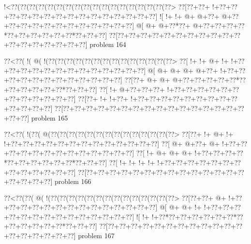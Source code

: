 \vbox{\vbox{\goo
\- !<\0??(\0??(\0??(\0??(\0??(\0??(\0??(\0??(\0??(\0??(\0??(\0??(\0??(\0??(\0??(\0??(\0??(\0??>
\0??[\0??+\0??+\- !+\0??+\0??+\0??+\0??+\0??+\0??+\0??+\0??+\0??+\0??+\0??+\0??+\0??+\0??+\0??]
\- ![\- !+\- !+\- @+\- @+\0??+\- @+\0??+\0??+\0??+\0??+\0??+\0??+\0??+\0??+\0??+\0??+\0??+\0??]
\- @[\- @+\- @+\0??*\0??+\- @+\0??+\0??+\0??+\0??*\0??+\0??+\0??+\0??+\0??+\0??*\0??+\0??+\0??]
\0??[\0??+\0??+\0??+\0??+\0??+\0??+\0??+\0??+\0??+\0??+\0??+\0??+\0??+\0??+\0??+\0??+\0??+\0??]
}
\hfil problem 164\hfil\break
}



\vbox{\vbox{\goo
\0??<\0??(\- !(\- @(\- !(\0??(\0??(\0??(\0??(\0??(\0??(\0??(\0??(\0??(\0??(\0??(\0??(\0??(\0??>
\0??[\- !+\- !+\- @+\- !+\- !+\0??+\0??+\0??+\0??+\0??+\0??+\0??+\0??+\0??+\0??+\0??+\0??+\0??]
\- @[\- @+\- @+\- @+\- @+\0??+\- !+\0??+\0??+\0??+\0??+\0??+\0??+\0??+\0??+\0??+\0??+\0??+\0??]
\0??[\0??+\- @+\- @+\- @+\0??+\0??+\0??+\0??+\0??*\0??+\0??+\0??+\0??+\0??+\0??*\0??+\0??+\0??]
\0??[\- !+\- @+\0??+\0??+\0??+\- !+\0??+\0??+\0??+\0??+\0??+\0??+\0??+\0??+\0??+\0??+\0??+\0??]
\0??[\0??+\- !+\- !+\0??+\- !+\0??+\0??+\0??+\0??+\0??+\0??+\0??+\0??+\0??+\0??+\0??+\0??+\0??]
\0??[\0??+\0??+\0??+\0??+\0??+\0??+\0??+\0??+\0??+\0??+\0??+\0??+\0??+\0??+\0??+\0??+\0??+\0??]
}
\hfil problem 165\hfil\break
}



\vbox{\vbox{\goo
\0??<\0??(\- !(\0??(\- @(\0??(\0??(\0??(\0??(\0??(\0??(\0??(\0??(\0??(\0??(\0??(\0??(\0??(\0??>
\0??[\0??+\- !+\- @+\- !+\- !+\0??+\0??+\0??+\0??+\0??+\0??+\0??+\0??+\0??+\0??+\0??+\0??+\0??]
\0??[\- @+\- @+\0??+\- @+\- !+\0??+\0??+\0??+\0??+\0??+\0??+\0??+\0??+\0??+\0??+\0??+\0??+\0??]
\0??[\- !+\- @+\- @+\- @+\- !+\0??+\0??+\0??+\0??*\0??+\0??+\0??+\0??+\0??+\0??*\0??+\0??+\0??]
\0??[\- !+\- !+\- !+\- !+\- !+\0??+\0??+\0??+\0??+\0??+\0??+\0??+\0??+\0??+\0??+\0??+\0??+\0??]
\0??[\0??+\0??+\0??+\0??+\0??+\0??+\0??+\0??+\0??+\0??+\0??+\0??+\0??+\0??+\0??+\0??+\0??+\0??]
}
\hfil problem 166\hfil\break
}



\vbox{\vbox{\goo
\0??<\0??(\0??(\- @(\- !(\0??(\0??(\0??(\0??(\0??(\0??(\0??(\0??(\0??(\0??(\0??(\0??(\0??(\0??>
\0??[\0??+\0??+\- @+\- !+\0??+\0??+\0??+\0??+\0??+\0??+\0??+\0??+\0??+\0??+\0??+\0??+\0??+\0??]
\- @[\- @+\- @+\- !+\- !+\0??+\0??+\0??+\0??+\0??+\0??+\0??+\0??+\0??+\0??+\0??+\0??+\0??+\0??]
\- ![\- !+\- !+\0??*\0??+\0??+\0??+\0??+\0??+\0??*\0??+\0??+\0??+\0??+\0??+\0??*\0??+\0??+\0??]
\0??[\0??+\0??+\0??+\0??+\0??+\0??+\0??+\0??+\0??+\0??+\0??+\0??+\0??+\0??+\0??+\0??+\0??+\0??]
}
\hfil problem 167\hfil\break
}



